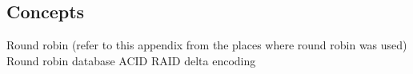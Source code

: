 \documentclass[12pt]{report}
\begin{document}
\begin{appendices}
\chapter{Concepts}
Round robin (refer to this appendix from the places where round robin
was used)
Round robin database
ACID
RAID
delta encoding
\end{appendices}




{}


\end{document}
